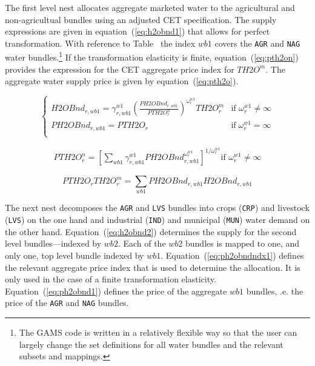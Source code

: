 \documentclass[11pt,letterpaper]{report}
\begin{document}
The first level nest allocates aggregate marketed water to the agricultural and
non-agricultual bundles using an adjusted CET specification. The supply
expressions are given in equation~(\ref{eq:h2obnd1}) that allows for perfect
transformation. With reference to Table~\label{ref:WatBundles} the index
$\mathit{wb1}$ covers the \texttt{AGR} and \texttt{NAG} water
bundles.\footnote{The GAMS code is written in a relatively flexible way so that
the user can largely change the set definitions for all water bundles and the
relevant subsets and mappings.} If the transformation elasticity is finite,
equation~(\ref{eq:pth2on}) provides the expression for the CET aggregate price
index for $\mathit{TH2O}^m$. The aggregate water supply price is given by
equation~(\ref{eq:pth2o}).

\begin{equation}
\label{eq:h2obnd1}
\begin{cases}
   \displaystyle \mathit{H2OBnd}_{r,\mathit{wb1}} =
      \gamma^{\mathit{w1}}_{r,\mathit{wb1}}
      \left( \frac{\mathit{PH2OBnd}_{r,\mathit{wb1}}} {\mathit{PTH2O}^n_{r}}
      \right)^{\omega^{\mathit{w1}}_{r}} \mathit{TH2O}^m_{r}
   & \textrm{if } \omega^{\mathit{w1}}_{r} \ne \infty \\
   \displaystyle \mathit{PH2OBnd}_{r,\mathit{wb1}} = \mathit{PTH2O}_{r}
   & \textrm{if} \; \omega^{\mathit{w1}}_{r} = \infty \\
\end{cases}
\end{equation}

\begin{equation}
\label{eq:pth2on}
\begin{array}{*{20}{l}}
   \mathit{PTH2O}^n_{r} =
      \left[ \sum_{\mathit{wb1}}{
         \gamma^{\mathit{w1}}_{r,\mathit{wb1}}
         \mathit{PH2OBnd}_{r,\mathit{wb1}}^{\omega^{\mathit{w1}}_{r}}
      }\right]^{1/\omega^{\mathit{w1}}_{r}}
   \textrm{if } \omega^{\mathit{w1}}_{r} \ne \infty
\end{array}
\end{equation}

\begin{equation}
\label{eq:pth2o}
\mathit{PTH2O}_{r} \mathit{TH2O}^m_{r} = \sum_{\mathit{wb1}}{
   \mathit{PH2OBnd}_{r,\mathit{wb1}} \mathit{H2OBnd}_{r,\mathit{wb1}}
}
\end{equation}

The next nest decomposes the \texttt{AGR} and \texttt{LVS} bundles into crops
(\texttt{CRP}) and livestock (\texttt{LVS}) on the one hand and industrial
(\texttt{IND}) and municipal (\texttt{MUN}) water demand on the other hand.
Equation~(\ref{eq:h2obnd2}) determines the supply for the second level
bundles---indexed by $\mathit{wb2}$. Each of the $\mathit{wb2}$ bundles is
mapped to one, and only one, top level bundle indexed by $\mathit{wb1}$.
Equation~(\ref{eq:ph2obndndx1}) defines the relevant aggregate price index that
is used to determine the allocation. It is only used in the case of a finite
transformation elasticity. Equation~(\ref{eq:ph2obnd1}) defines the price of the
aggregate $\mathit{wb1}$ bundles, .e. the price of the \texttt{AGR} and
\texttt{NAG} bundles.
\end{document}
